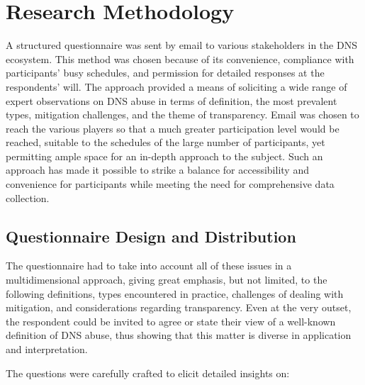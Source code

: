 \chapter{Research Methodology}



A structured questionnaire was sent by email to various stakeholders in the DNS ecosystem. This method was chosen because of its convenience, compliance with participants' busy schedules, and permission for detailed responses at the respondents' will. The approach provided a means of soliciting a wide range of expert observations on DNS abuse in terms of definition, the most prevalent types, mitigation challenges, and the theme of transparency. Email was chosen to reach the various players so that a much greater participation level would be reached, suitable to the schedules of the large number of participants, yet permitting ample space for an in-depth approach to the subject. Such an approach has made it possible to strike a balance for accessibility and convenience for participants while meeting the need for comprehensive data collection.



\section{Questionnaire Design and Distribution} 

The questionnaire had to take into account all of these issues in a multidimensional approach, giving great emphasis, but not limited, to the following definitions, types encountered in practice, challenges of dealing with mitigation, and considerations regarding transparency. Even at the very outset, the respondent could be invited to agree or state their view of a well-known definition of DNS abuse, thus showing that this matter is diverse in application and interpretation.

The questions were carefully crafted to elicit detailed insights on:

